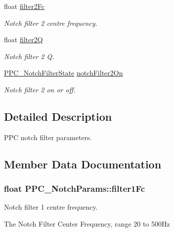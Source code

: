 \begin{DoxyCompactItemize}
float \hyperlink{struct_p_p_c___notch_params_acdc4737cbd21c081b7168ffa319f6b5d}{filter2\+Fc}
\begin{DoxyCompactList}\small\item\em Notch filter 2 centre frequency. \end{DoxyCompactList}\item 
float \hyperlink{struct_p_p_c___notch_params_a6497c8fb67944986495f43f174b42349}{filter2Q}
\begin{DoxyCompactList}\small\item\em Notch filter 2 Q. \end{DoxyCompactList}\item 
\hyperlink{group___benchtop_precision_piezo_ga03b89881d4e9a76087bbe1d517dd62b0}{P\+P\+C\+\_\+\+Notch\+Filter\+State} \hyperlink{struct_p_p_c___notch_params_a6d5d54992092f9013ec109fb99416a91}{notch\+Filter2\+On}
\begin{DoxyCompactList}\small\item\em Notch filter 2 on or off. \end{DoxyCompactList}\end{DoxyCompactItemize}


\subsection{Detailed Description}
P\+PC notch filter parameters. 



\subsection{Member Data Documentation}
\subsubsection[{\texorpdfstring{filter1\+Fc}{filter1Fc}}]{\setlength{\rightskip}{0pt plus 5cm}float P\+P\+C\+\_\+\+Notch\+Params\+::filter1\+Fc}\hypertarget{struct_p_p_c___notch_params_abcb5b7fdcd6c42059445447f177c4733}{}\label{struct_p_p_c___notch_params_abcb5b7fdcd6c42059445447f177c4733}


Notch filter 1 centre frequency. 

The Notch Filter Center Frequency, range 20 to 500\+Hz

